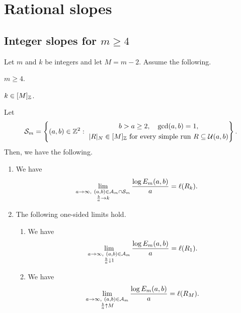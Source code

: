 \section{Rational slopes}\label{sec:rational}
\subsection{Integer slopes for \texorpdfstring{$m\ge4$}{m >= 4}}
\begin{proposition}\label{prop:integer}
Let $m$ and $k$ be integers and let $M=m-2$. Assume the following.
\begin{hypotheses}
\item\label{hyp:integer-arrows} $m\ge4$.
\item\label{hyp:integer-range} $k\in[M]_{\mathbb Z}$.
\end{hypotheses}
Let
\[
 \mathcal S_m=
 \left\{(a,b)\in\mathbb Z^2:\
 \begin{gathered}
 b>a\ge2,\quad \gcd(a,b)=1,\\
 |R|_N\in[M]_{\mathbb Z}\text{ for every simple run }R\subseteq\mathcal U(a,b)
 \end{gathered}\right\}.
\]
Then, we have the following.

\begin{enumerate}
\item\label{c:integer-limit} We have
\[
 \lim_{\substack{a\to\infty,\ (a,b)\in\cA_m\cap\mathcal S_m\\\frac{b}{a}\to k}}
 \frac{\log E_m(a,b)}a=\ell(R_k).
\]
\item\label{c:integer-endpoints} The following one-sided limits hold.
\begin{enumerate}[label=(\alph*),ref=\theenumi(\alph*)]
\item\label{c:integer-left-endpoint} We have
\[
 \lim_{\substack{a\to\infty,\ (a,b)\in\mathcal A_m\\\frac ba\downarrow1}}
 \frac{\log E_m(a,b)}a=\ell(R_1).
\]
\item\label{c:integer-right-endpoint} We have
\[
 \lim_{\substack{a\to\infty,\ (a,b)\in\mathcal A_m\\\frac ba\uparrow M}}
 \frac{\log E_m(a,b)}a=\ell(R_M).
\]
\end{enumerate}
\end{enumerate}
\end{proposition}
